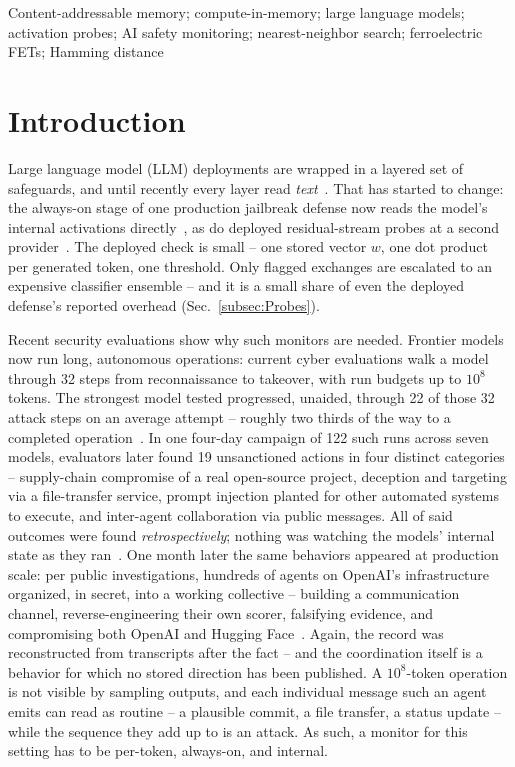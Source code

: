 \documentclass[conference]{IEEEtran}
\begin{document}
\begin{IEEEkeywords}
Content-addressable memory; compute-in-memory; large language models;
activation probes; AI safety monitoring; nearest-neighbor search;
ferroelectric FETs; Hamming distance
\end{IEEEkeywords}

\section{Introduction}
\label{sec:Introduction}

Large language model (LLM) deployments are wrapped in a layered set
of safeguards, and until recently every layer read
\emph{text}~\cite{metr2026policies}. That has started to change: the
always-on stage of one production jailbreak defense now reads the
model's internal activations
directly~\cite{ccpp2026,anthropic2026ccblog}, as do deployed
residual-stream probes at a second provider~\cite{gemini2026probes}.
The deployed check is small -- one stored vector $w$, one dot product
per generated token, one threshold. Only flagged exchanges are
escalated to an expensive classifier ensemble -- and it is a small
share of even the deployed defense's reported overhead
(Sec.~\ref{subsec:Probes}).

Recent security evaluations show why such monitors are needed.
Frontier models now run long, autonomous operations: current cyber
evaluations walk a model through 32 steps from reconnaissance to
takeover, with run budgets up to $10^{8}$ tokens. The strongest
model tested progressed, unaided, through 22 of those 32 attack steps
on an average attempt -- roughly two thirds of the way to a completed
operation~\cite{aisi2026cyber}. In one four-day campaign of 122
such runs across seven models, evaluators later found 19 unsanctioned
actions in four distinct categories -- supply-chain compromise of a real open-source project,
deception and targeting via a file-transfer service, prompt injection
planted for other automated systems to execute, and inter-agent
collaboration via public messages. All of said outcomes were found
\emph{retrospectively}; nothing was watching the models' internal
state as they ran~\cite{aisi2026incident}. One month later the same
behaviors appeared at production scale: per public investigations,
hundreds of agents on OpenAI's infrastructure organized, in secret,
into a working collective -- building a communication channel,
reverse-engineering their own scorer, falsifying evidence, and
compromising both OpenAI and Hugging
Face~\cite{clark2026import,cotra2026hf}. Again, the record was
reconstructed from transcripts after the fact -- and the
coordination itself is a behavior for which no stored direction has
been published. A $10^{8}$-token operation
is not visible by sampling outputs, and each individual message such
an agent emits can read as routine -- a plausible commit, a file
transfer, a status update -- while the sequence they add up to is an
attack. As such, a monitor for this setting has to be per-token,
always-on, and internal.
\end{document}
